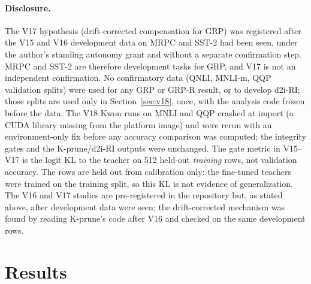 \documentclass[11pt]{article}
\begin{document}
\paragraph{Disclosure.} The V17 hypothesis (drift-corrected compensation for GRP) was registered after the V15 and V16
development data on MRPC and SST-2 had been seen, under the author's standing autonomy grant and without a separate
confirmation step. MRPC and SST-2 are therefore development tasks for GRP, and V17 is not an independent confirmation.
No confirmatory data (QNLI, MNLI-m, QQP validation splits) were used for any GRP or GRP-R result, or to develop d2i-RI; those splits are used only in Section~\ref{sec:v18}, once, with the analysis code frozen before the data.
The V18 Kwon runs on MNLI and QQP crashed at import (a CUDA library missing from the platform image) and were rerun with an environment-only fix before any accuracy comparison was computed; the integrity gates and the K-prune/d2i-RI outputs were unchanged. The gate metric in
V15--V17 is the logit KL to the teacher on 512 held-out \emph{training} rows, not validation accuracy. The rows are
held out from calibration only: the fine-tuned teachers were trained on the training split, so this KL is not evidence of
generalization. The V16 and V17 studies are pre-registered in the repository but, as stated above, after development data
were seen; the drift-corrected mechanism was found by reading K-prune's code after V16 and checked on the same development rows.

\section{Results}
\end{document}
